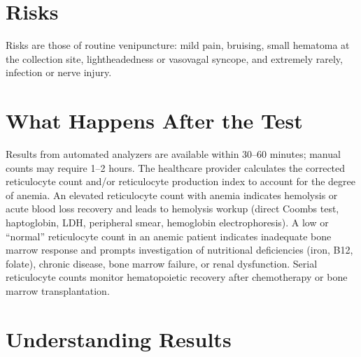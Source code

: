 \section*{Risks}
Risks are those of routine venipuncture: mild pain, bruising, small hematoma at the collection site, lightheadedness or vasovagal syncope, and extremely rarely, infection or nerve injury.

\section*{What Happens After the Test}
Results from automated analyzers are available within 30--60 minutes; manual counts may require 1--2 hours. The healthcare provider calculates the corrected reticulocyte count and/or reticulocyte production index to account for the degree of anemia. An elevated reticulocyte count with anemia indicates hemolysis or acute blood loss recovery and leads to hemolysis workup (direct Coombs test, haptoglobin, LDH, peripheral smear, hemoglobin electrophoresis). A low or ``normal'' reticulocyte count in an anemic patient indicates inadequate bone marrow response and prompts investigation of nutritional deficiencies (iron, B12, folate), chronic disease, bone marrow failure, or renal dysfunction. Serial reticulocyte counts monitor hematopoietic recovery after chemotherapy or bone marrow transplantation.

\section*{Understanding Results}


